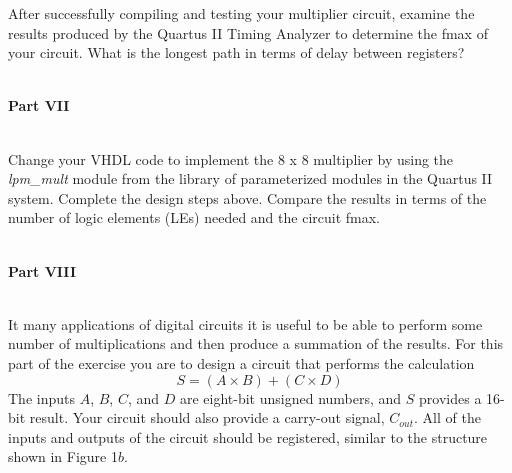 \documentclass[psfig,10pt,fullpage]{article}
\begin{document}
After successfully compiling and testing your multiplier circuit, examine the results
produced by the Quartus II Timing Analyzer to determine the fmax of your circuit. 
What is the longest path in terms of delay between registers?

~\\
\noindent
{\bf Part VII}

~\\
\noindent
Change your VHDL code to implement the 8 {\sf x} 8 multiplier by using the
{\it lpm\_mult} module from the library of parameterized modules in the Quartus II
system. Complete the design steps above. Compare the results in terms of the 
number of logic elements (LEs) needed and the circuit fmax.

~\\
\noindent
{\bf Part VIII}

~\\
\noindent
It many applications of digital circuits it is useful to be able to perform some number of
multiplications and then produce a summation of the results. For this part of the exercise
you are to design a circuit that performs the calculation
$$
S = (A \times B) + (C \times D)
$$
\noindent
The inputs $A$, $B$, $C$, and $D$ are eight-bit unsigned numbers, and $S$ provides a
16-bit result. Your circuit should also provide a carry-out signal, $C_{out}$. All of the
inputs and outputs of the circuit should be registered, similar to the structure
shown in Figure 1$b$.
\end{document}

